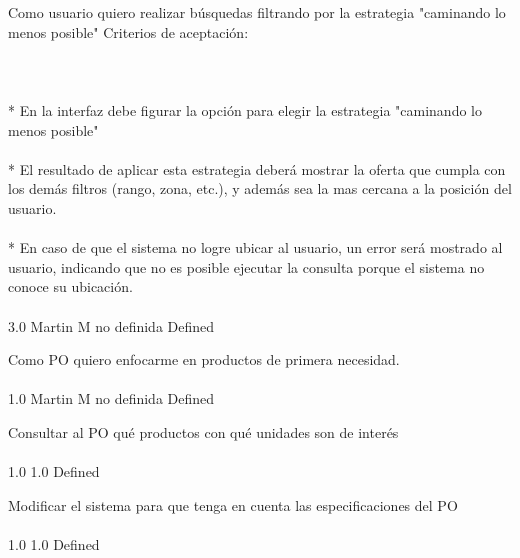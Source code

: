 \vspace{20pt}

	{Como usuario quiero realizar búsquedas filtrando por la estrategia "caminando lo menos posible"} %
	{Criterios de aceptación:\\
\\
  \\
\\
* En la interfaz debe figurar la opción para elegir la estrategia "caminando lo menos posible"\\
\\
* El resultado de aplicar esta estrategia deberá mostrar la oferta que cumpla con los demás filtros (rango, zona, etc.), y además sea la mas cercana a la posición del usuario.\\
\\
* En caso de que el sistema no logre ubicar al usuario, un error será mostrado al usuario, indicando que no es posible ejecutar la consulta porque el sistema no conoce su ubicación.\\
\\
} %
	{} %
	{3.0} %
	{Martin M} %
	{no definida} %
	{Defined} %


\vspace{20pt}

	{Como PO quiero enfocarme en productos de primera necesidad.} %
	{\\
\\
} %
	{} %
	{1.0} %
	{Martin M} %
	{no definida} %
	{Defined} %

		{Consultar al PO qué productos con qué unidades son de interés} %
		{\\
\\
} %
		{1.0} %
		{} %
		{1.0} %
		{Defined} %

		{Modificar el sistema para que tenga en cuenta las especificaciones del PO} %
		{\\
\\
} %
		{1.0} %
		{} %
		{1.0} %
		{Defined} %


